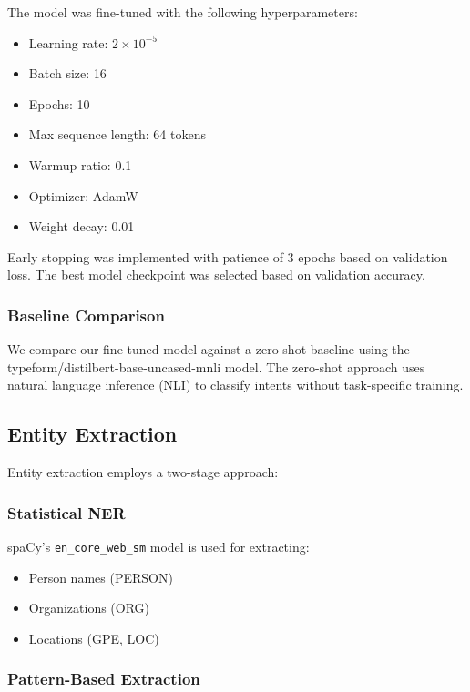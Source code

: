\documentclass[conference]{IEEEtran}
\begin{document}
The model was fine-tuned with the following hyperparameters:
\begin{itemize}
    \item Learning rate: $2 \times 10^{-5}$
    \item Batch size: 16
    \item Epochs: 10
    \item Max sequence length: 64 tokens
    \item Warmup ratio: 0.1
    \item Optimizer: AdamW
    \item Weight decay: 0.01
\end{itemize}

Early stopping was implemented with patience of 3 epochs based on validation loss. The best model checkpoint was selected based on validation accuracy.

\subsubsection{Baseline Comparison}

We compare our fine-tuned model against a zero-shot baseline using the typeform/distilbert-base-uncased-mnli model. The zero-shot approach uses natural language inference (NLI) to classify intents without task-specific training.

\subsection{Entity Extraction}

Entity extraction employs a two-stage approach:

\subsubsection{Statistical NER}

spaCy's \texttt{en\_core\_web\_sm} model is used for extracting:
\begin{itemize}
    \item Person names (PERSON)
    \item Organizations (ORG)
    \item Locations (GPE, LOC)
\end{itemize}

\subsubsection{Pattern-Based Extraction}
\end{document}
